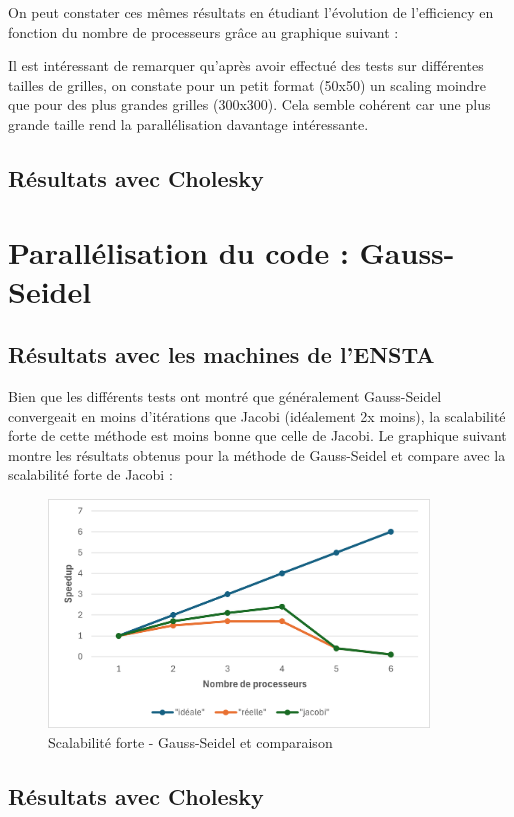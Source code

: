 \documentclass{article}
\begin{document}
On peut constater ces mêmes résultats en étudiant l'évolution de l'efficiency en fonction du nombre de processeurs grâce au graphique suivant :


Il est intéressant de remarquer qu'après avoir effectué des tests sur différentes tailles de grilles, on constate pour un petit format (50x50) un scaling moindre que pour des plus grandes grilles (300x300). Cela semble cohérent car une plus grande taille rend la parallélisation davantage intéressante.

\subsection{Résultats avec Cholesky}


\section{Parallélisation du code : Gauss-Seidel}

\subsection{Résultats avec les machines de l'ENSTA}

Bien que les différents tests ont montré que généralement Gauss-Seidel convergeait en moins d'itérations que Jacobi (idéalement 2x moins), la scalabilité forte de cette méthode est moins bonne que celle de Jacobi. Le graphique suivant montre les résultats obtenus pour la méthode de Gauss-Seidel et compare avec la scalabilité forte de Jacobi :

\begin{figure}[H]
    \centering
    \includegraphics[width=0.9\textwidth]{strong_scaling_gs.png}
    \caption{Scalabilité forte - Gauss-Seidel et comparaison}
    \label{fig:placeholder}
\end{figure}


\subsection{Résultats avec Cholesky}
\end{document}
